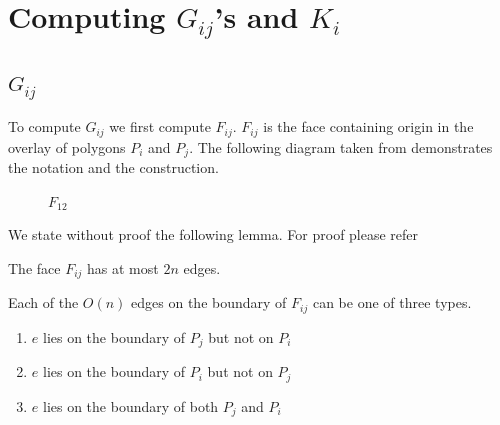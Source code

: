 \chapter{Computing $G_{ij}$'s and $K_{i}$}

\section{$G_{ij}$}

To compute $G_{ij}$ we first compute $F_{ij}$. $F_{ij}$ is the face containing origin in the overlay of polygons $P_{i}$ and $P_{j}$.
The following diagram taken from \cite{key1} demonstrates the notation and the construction.

\begin{figure}[h]
\begin{center}
\caption{\label{fig:Construction}$F_{12}$}
\end{center}
\end{figure}

We state without proof the following lemma. For proof please refer \cite{key1}
\begin{lemma}
 The face $F_{ij}$ has at most $2n$ edges.
\end{lemma}

Each of the $O(n)$ edges on the boundary of $F_{ij}$ can be one of three types.
\begin{enumerate}
 \item 
$e$ lies on the boundary of $P_{j}$ but not on $P_{i}$
 \item 
$e$ lies on the boundary of $P_{i}$ but not on $P_{j}$
 \item 
$e$ lies on the boundary of both $P_{j}$ and $P_{i}$

\end{enumerate}

